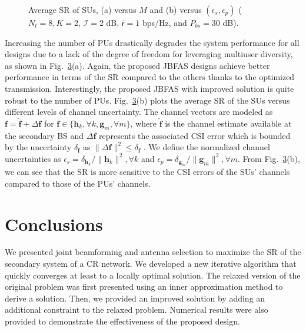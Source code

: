 \documentclass[english]{IEEEtran}
\theoremstyle{plain}
\theoremstyle{remark}
\begin{document}
\begin{figure}
    \begin{center}
    \begin{subfigure}[Average SR of SUs versus $M$.]{
        \texttt{[image: SumratevsM.eps]}}
    		\label{fig:SRvsM}
				\end{subfigure}
		\begin{subfigure}[Average SR of SUs versus   channel uncertainties with $M=2$.]{
        \texttt{[image: SRvsCSI.eps]}}
        \label{fig:SRvsCSI}
    \end{subfigure}
		\caption{Average SR of SUs, (a) versus $M$ and (b) versus $(\epsilon_s,\epsilon_p)$ ($N_t = 8, K = 2$, $\mathcal{I} = 2$ dB, $\mathsf{\bar{r}} = 1$ bps/Hz, and $P_{bs} = 30$ dB).}\label{fig:SRvsMCSI}
\end{center}
\end{figure}


Increasing the number of PUs drastically degrades the system performance for all designs due to a lack of the degree of freedom for
leveraging multiuser diversity, as shown in Fig.~\ref{fig:SRvsMCSI}(a). Again, the proposed JBFAS designs achieve better performance in terms of the SR compared to the others thanks to the optimized transmission.  Interestingly, the
proposed JBFAS with improved solution is quite robust to the number of  PUs.  Fig.~\ref{fig:SRvsMCSI}(b) plots   the average SR of the SUs versus different levels of channel uncertainty.  The channel vectors are modeled as $\mathbf{f} = \hat{\mathbf{f}} + \Delta\mathbf{f}$ for  $\mathbf{f}\in\{\mathbf{h}_k,\forall k,\mathbf{g}_m,\forall m\}$, where $\hat{\mathbf{f}}$ is the channel estimate available at the secondary BS and $\Delta\mathbf{f}$ represents the associated CSI error which is bounded by the uncertainty $\delta_{\mathbf{f}}$ as $\|\Delta\mathbf{f}\|^2 \leq \delta_{\mathbf{f}}$ \cite{NguyenCL16}. We define the normalized channel uncertainties as $\epsilon_s = \delta_{\mathbf{h}_k}/\|\mathbf{h}_k\|^2,\forall k$ and $\epsilon_p = \delta_{\mathbf{g}_m}/\|\mathbf{g}_m\|^2,\forall m$. From Fig.~\ref{fig:SRvsMCSI}(b), we can see that the SR is more sensitive to the CSI errors of the SUs' channels compared to those of the PUs' channels.   

\vspace*{-0.41cm}
\section{Conclusions}
\label{Conclusion}
We  presented  joint beamforming and antenna selection to maximize the SR of the secondary system of a CR network. We  developed a new iterative algorithm that quickly converges at least to a
locally optimal solution. The relaxed version of the original problem was first presented using an inner approximation method to  derive a solution. Then, we provided an improved solution by adding an additional constraint to the relaxed problem.  Numerical results  were also provided to demonstrate the  effectiveness of the proposed design. 
\vspace*{-0.4cm}



\end{document}
